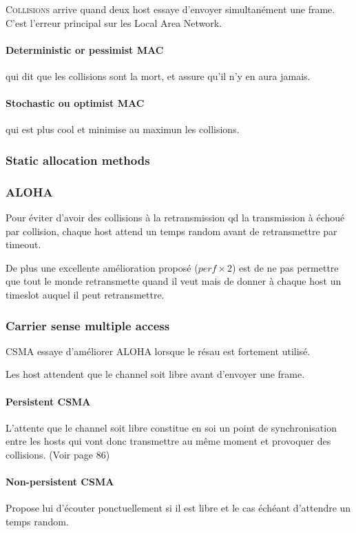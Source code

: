 \documentclass{report}
\begin{document}
\textsc{Collisions} arrive quand deux host essaye d'envoyer simultanément une frame. 
C'est l'erreur principal sur les Local Area Network.

\paragraph{Deterministic or pessimist MAC} qui dit que les collisions sont la mort, et 
assure qu'il n'y en aura jamais.

\paragraph{Stochastic ou optimist MAC} qui est plus cool et minimise au maximun
les collisions.


\subsubsection{Static allocation methods}

\subsubsection{ALOHA}
Pour éviter d'avoir des collisions à la retransmission qd la transmission à échoué
par collision, chaque host attend un temps random avant de retransmettre par timeout.

De plus une excellente amélioration proposé ($perf \times 2$) est de ne pas permettre
que tout le monde retransmette quand il veut mais de donner à chaque host un timeslot
auquel il peut retransmettre.

\subsubsection{Carrier sense multiple access}
CSMA essaye d'améliorer ALOHA lorsque le résau est fortement utilisé.

Les host attendent que le channel soit libre avant d'envoyer une frame.

\paragraph{Persistent CSMA} L'attente que le channel soit libre constitue en soi
un point de synchronisation entre les hosts qui vont donc transmettre au même moment 
et provoquer des collisions. (Voir page 86)

\paragraph{Non-persistent CSMA} Propose lui d'écouter ponctuellement si il est libre
et le cas échéant d'attendre un temps random.
\end{document}
